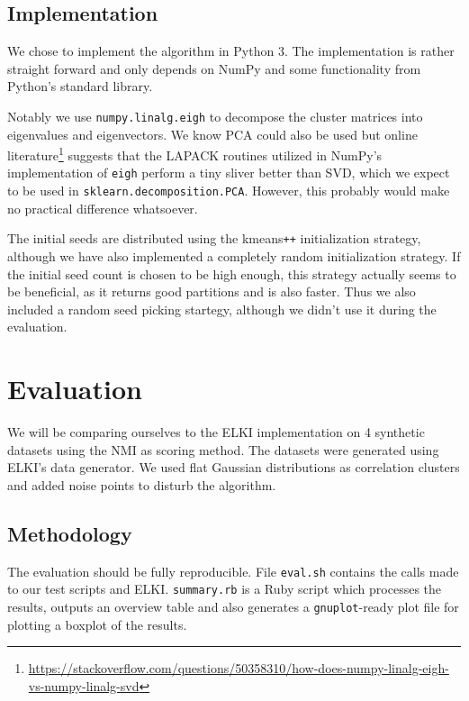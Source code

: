 \documentclass[english]{scrartcl}
\begin{document}
\subsection{Implementation}

We chose to implement the algorithm in Python 3. The implementation is rather straight
forward and only depends on NumPy and some functionality from Python's standard
library.

Notably we use \texttt{numpy.linalg.eigh} to decompose the cluster matrices
into eigenvalues and eigenvectors. We know PCA could also be used but online
literature\footnote{\url{https://stackoverflow.com/questions/50358310/how-does-numpy-linalg-eigh-vs-numpy-linalg-svd}}
suggests that the LAPACK routines utilized in NumPy's implementation of
\texttt{eigh} perform a tiny sliver better than SVD, which we expect to be used
in \texttt{sklearn.decomposition.PCA}.  However, this probably would make no
practical difference whatsoever.

The initial seeds are distributed using the kmeans\texttt{++} initialization strategy,
although we have also implemented a completely random initialization strategy.
If the initial seed count is chosen to be high enough, this strategy actually
seems to be beneficial, as it returns good partitions and is also faster. Thus
we also included a random seed picking startegy, although we didn't use it
during the evaluation.

\pagebreak
\section{Evaluation}

We will be comparing ourselves to the ELKI implementation on 4 synthetic datasets
using the NMI as scoring method. The datasets were generated using ELKI's data generator.
We used flat Gaussian distributions as correlation clusters and added noise points
to disturb the algorithm.

\subsection{Methodology}

The evaluation should be fully reproducible. File \texttt{eval.sh} contains the calls made to our
test scripts and ELKI. \texttt{summary.rb} is a Ruby script which processes the results, outputs
an overview table and also generates a \texttt{gnuplot}-ready plot file for plotting a boxplot of
the results.
\end{document}
